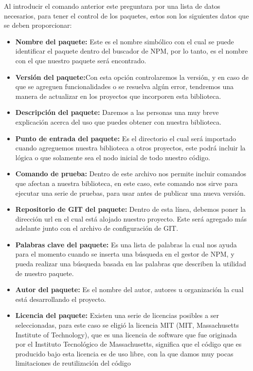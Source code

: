     \newline
    \newline
    Al introducir el comando anterior este preguntara por una lista de datos necesarios, para tener el control de los paquetes, estos son los siguientes datos que se deben proporcionar:
    \begin{itemize}
    \item \textbf{Nombre del paquete:} Este es el nombre simbólico con el cual se puede identificar el paquete dentro del buscador de NPM, por lo tanto, es el nombre con el que nuestro paquete será encontrado.
    \item \textbf{Versión del paquete:}Con esta opción controlaremos la versión, y en caso de que se agreguen funcionalidades o se resuelva algún error, tendremos una manera de actualizar en los proyectos que incorporen esta biblioteca.
    \item \textbf{Descripción del paquete: }Daremos a las personas una muy breve explicación acerca del uso que puedes obtener con nuestra biblioteca.
    \item \textbf{Punto de entrada del paquete:} Es el directorio el cual será importado cuando agreguemos nuestra biblioteca a otros proyectos, este podrá incluir la lógica o que solamente sea el nodo inicial de todo nuestro código.
    \item \textbf{Comando de prueba:} Dentro de este archivo nos permite incluir comandos que afectan a nuestra biblioteca, en este caso, este comando nos sirve para ejecutar una serie de pruebas, para usar antes de publicar una nueva versión.
    \item \textbf{Repositorio de GIT del paquete:} Dentro de esta línea, debemos poner la dirección url en el cual está alojado nuestro proyecto. Este será agregado más adelante junto con el archivo de configuración de GIT.
    \item \textbf{Palabras clave del paquete:} Es una lista de palabras la cual nos ayuda para el momento cuando se inserta una búsqueda en el gestor de NPM, y pueda realizar una búsqueda basada en las palabras que describen la utilidad de nuestro paquete.
    \item \textbf{Autor del paquete:} Es el nombre del autor, autores u organización la cual está desarrollando el proyecto.
    \item \textbf{Licencia del paquete:} Existen una serie de licencias posibles a ser seleccionadas, para este caso se eligió la licencia MIT (MIT, Massachusetts Institute of Technology), que es una licencia de software que fue originada por el Instituto Tecnológico de Massachusetts, significa que el código que es producido bajo esta licencia es de uso libre, con la que damos muy pocas limitaciones de reutilización del código 
    \end{itemize}
